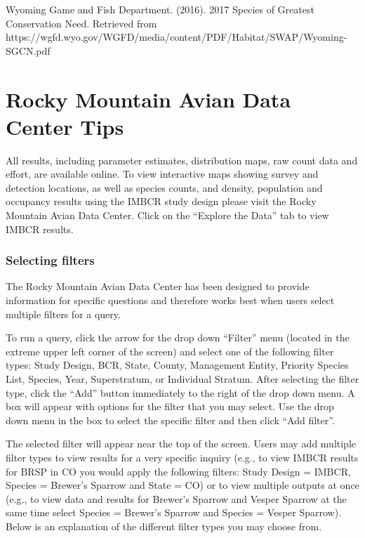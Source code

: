 \documentclass[
  letterpaper,
  DIV=11,
  numbers=noendperiod,
  oneside]{scrreprt}
\begin{document}
Wyoming Game and Fish Department. (2016). 2017 Species of Greatest
Conservation Need. Retrieved from
https://wgfd.wyo.gov/WGFD/media/content/PDF/Habitat/SWAP/Wyoming-SGCN.pdf

\appendix
{}

\hypertarget{rocky-mountain-avian-data-center-tips}{%
\chapter{Rocky Mountain Avian Data Center
Tips}\label{rocky-mountain-avian-data-center-tips}}

All results, including parameter estimates, distribution maps, raw count
data and effort, are available online. To view interactive maps showing
survey and detection locations, as well as species counts, and density,
population and occupancy results using the IMBCR study design please
visit the Rocky Mountain Avian Data Center. Click on the ``Explore the
Data'' tab to view IMBCR results.

\hypertarget{selecting-filters}{%
\subsection*{Selecting filters}\label{selecting-filters}}

The Rocky Mountain Avian Data Center has been designed to provide
information for specific questions and therefore works best when users
select multiple filters for a query.

To run a query, click the arrow for the drop down ``Filter'' menu
(located in the extreme upper left corner of the screen) and select one
of the following filter types: Study Design, BCR, State, County,
Management Entity, Priority Species List, Species, Year, Superstratum,
or Individual Stratum. After selecting the filter type, click the
``Add'' button immediately to the right of the drop down menu. A box
will appear with options for the filter that you may select. Use the
drop down menu in the box to select the specific filter and then click
``Add filter''.

The selected filter will appear near the top of the screen. Users may
add multiple filter types to view results for a very specific inquiry
(e.g., to view IMBCR results for BRSP in CO you would apply the
following filters: Study Design = IMBCR, Species = Brewer's Sparrow and
State = CO) or to view multiple outputs at once (e.g., to view data and
results for Brewer's Sparrow and Vesper Sparrow at the same time select
Species = Brewer's Sparrow and Species = Vesper Sparrow). Below is an
explanation of the different filter types you may choose from.
\end{document}

